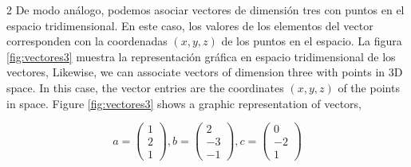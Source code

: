 \begin{paracol}{2}
De modo análogo, podemos asociar vectores de dimensión tres con puntos en el espacio tridimensional. En este caso, los valores de los elementos del vector corresponden con la coordenadas $(x,y,z)$ de los puntos en el espacio. La figura \ref{fig:vectores3} muestra la representación gráfica en espacio tridimensional de los vectores,
\switchcolumn
Likewise, we can associate vectors of dimension three with points in 3D space. In this case, the vector entries are the coordinates $(x,y,z)$ of the points in space. Figure \ref{fig:vectores3} shows a graphic representation of vectors,
\end{paracol}
\begin{equation*}
a=
\begin{pmatrix}
1\\
2\\
1
\end{pmatrix},
b=
\begin{pmatrix}
2\\
-3\\
-1
\end{pmatrix},
c=
\begin{pmatrix}
0\\
-2\\
1
\end{pmatrix}
\end{equation*}

